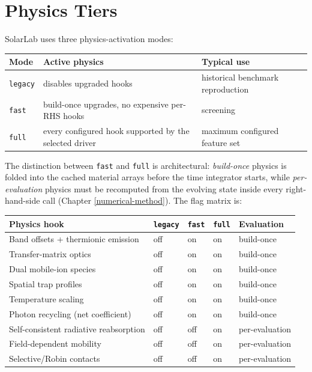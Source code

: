 \documentclass[
  11pt,
  american,
]{report}
\begin{document}
\hypertarget{physics-tiers}{%
\chapter{Physics Tiers}\label{physics-tiers}}

SolarLab uses three physics-activation modes:

\begin{longtable}[]{@{}
  >{\raggedright\arraybackslash}p{}
  >{\raggedright\arraybackslash}p{}
  >{\raggedright\arraybackslash}p{}@{}}
\toprule
Mode & Active physics & Typical use \\
\midrule
\endhead
\texttt{legacy} & disables upgraded hooks & historical benchmark
reproduction \\
\texttt{fast} & build-once upgrades, no expensive per-RHS hooks &
screening \\
\texttt{full} & every configured hook supported by the selected driver &
maximum configured feature set \\
\bottomrule
\end{longtable}

The distinction between \texttt{fast} and \texttt{full} is
architectural: \emph{build-once} physics is folded into the cached
material arrays before the time integrator starts, while
\emph{per-evaluation} physics must be recomputed from the evolving state
inside every right-hand-side call (Chapter \ref{numerical-method}). The
flag matrix is:

\begin{longtable}[]{@{}lllll@{}}
\toprule
Physics hook & \texttt{legacy} & \texttt{fast} & \texttt{full} &
Evaluation \\
\midrule
\endhead
Band offsets + thermionic emission & off & on & on & build-once \\
Transfer-matrix optics & off & on & on & build-once \\
Dual mobile-ion species & off & on & on & build-once \\
Spatial trap profiles & off & on & on & build-once \\
Temperature scaling & off & on & on & build-once \\
Photon recycling (net coefficient) & off & on & on & build-once \\
Self-consistent radiative reabsorption & off & off & on &
per-evaluation \\
Field-dependent mobility & off & off & on & per-evaluation \\
Selective/Robin contacts & off & off & on & per-evaluation \\
\bottomrule
\end{longtable}
\end{document}

